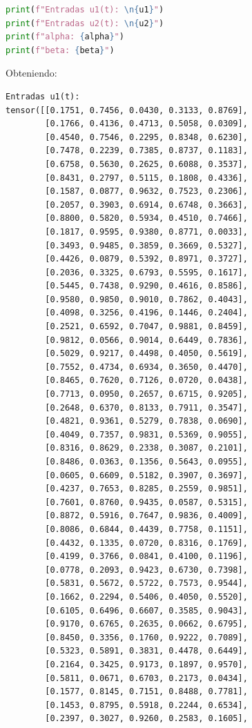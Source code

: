 \documentclass[12 pt]{article}
\begin{document}
\begin{enumerate}
\begin{lstlisting}[language=Python]
print(f"Entradas u1(t): \n{u1}")
print(f"Entradas u2(t): \n{u2}")
print(f"alpha: {alpha}")
print(f"beta: {beta}")
\end{lstlisting}

Obteniendo:

\begin{lstlisting}
Entradas u1(t): 
tensor([[0.1751, 0.7456, 0.0430, 0.3133, 0.8769],
        [0.1766, 0.4136, 0.4713, 0.5058, 0.0309],
        [0.4540, 0.7546, 0.2295, 0.8348, 0.6230],
        [0.7478, 0.2239, 0.7385, 0.8737, 0.1183],
        [0.6758, 0.5630, 0.2625, 0.6088, 0.3537],
        [0.8431, 0.2797, 0.5115, 0.1808, 0.4336],
        [0.1587, 0.0877, 0.9632, 0.7523, 0.2306],
        [0.2057, 0.3903, 0.6914, 0.6748, 0.3663],
        [0.8800, 0.5820, 0.5934, 0.4510, 0.7466],
        [0.1817, 0.9595, 0.9380, 0.8771, 0.0033],
        [0.3493, 0.9485, 0.3859, 0.3669, 0.5327],
        [0.4426, 0.0879, 0.5392, 0.8971, 0.3727],
        [0.2036, 0.3325, 0.6793, 0.5595, 0.1617],
        [0.5445, 0.7438, 0.9290, 0.4616, 0.8586],
        [0.9580, 0.9850, 0.9010, 0.7862, 0.4043],
        [0.4098, 0.3256, 0.4196, 0.1446, 0.2404],
        [0.2521, 0.6592, 0.7047, 0.9881, 0.8459],
        [0.9812, 0.0566, 0.9014, 0.6449, 0.7836],
        [0.5029, 0.9217, 0.4498, 0.4050, 0.5619],
        [0.7552, 0.4734, 0.6934, 0.3650, 0.4470],
        [0.8465, 0.7620, 0.7126, 0.0720, 0.0438],
        [0.7713, 0.0950, 0.2657, 0.6715, 0.9205],
        [0.2648, 0.6370, 0.8133, 0.7911, 0.3547],
        [0.4821, 0.9361, 0.5279, 0.7838, 0.0690],
        [0.4049, 0.7357, 0.9831, 0.5369, 0.9055],
        [0.8316, 0.8629, 0.2338, 0.3087, 0.2101],
        [0.8486, 0.0363, 0.1356, 0.5643, 0.0955],
        [0.0605, 0.6609, 0.5182, 0.3907, 0.3697],
        [0.4237, 0.7653, 0.8285, 0.2559, 0.9851],
        [0.7601, 0.8760, 0.9435, 0.0587, 0.5315],
        [0.8872, 0.5916, 0.7647, 0.9836, 0.4009],
        [0.8086, 0.6844, 0.4439, 0.7758, 0.1151],
        [0.4432, 0.1335, 0.0720, 0.8316, 0.1769],
        [0.4199, 0.3766, 0.0841, 0.4100, 0.1196],
        [0.0778, 0.2093, 0.9423, 0.6730, 0.7398],
        [0.5831, 0.5672, 0.5722, 0.7573, 0.9544],
        [0.1662, 0.2294, 0.5406, 0.4050, 0.5520],
        [0.6105, 0.6496, 0.6607, 0.3585, 0.9043],
        [0.9170, 0.6765, 0.2635, 0.0662, 0.6795],
        [0.8450, 0.3356, 0.1760, 0.9222, 0.7089],
        [0.5323, 0.5891, 0.3831, 0.4478, 0.6449],
        [0.2164, 0.3425, 0.9173, 0.1897, 0.9570],
        [0.5811, 0.0671, 0.6703, 0.2173, 0.0434],
        [0.1577, 0.8145, 0.7151, 0.8488, 0.7781],
        [0.1453, 0.8795, 0.5918, 0.2244, 0.6534],
        [0.2397, 0.3027, 0.9260, 0.2583, 0.1605],

\end{lstlisting}
\end{enumerate}
\end{document}
